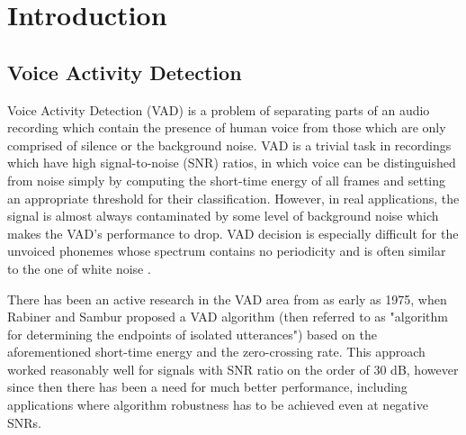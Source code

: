 
\chapter{Introduction} %

\label{Chapter1} %



\section{Voice Activity Detection}

Voice Activity Detection (VAD) is a problem of separating parts of an audio recording which contain the presence of human voice from those which are only comprised of silence or the background noise. VAD is a trivial task in recordings which have high signal-to-noise (SNR) ratios, in which voice can be distinguished from noise simply by computing the short-time energy of all frames and setting an appropriate threshold for their classification. However, in real applications, the signal is almost always contaminated by some level of background noise which makes the VAD's performance to drop. VAD decision is especially difficult for the unvoiced phonemes \cite{Kondoz} whose spectrum contains no periodicity and is often similar to the one of white noise \cite{Michaelis}. \medskip

There has been an active research in the VAD area from as early as 1975, when Rabiner and Sambur \cite{RabinerSambur} proposed a VAD algorithm (then referred to as "algorithm for determining the endpoints of isolated utterances") based on the aforementioned short-time energy and the zero-crossing rate. This approach worked reasonably well for signals with SNR ratio on the order of 30 dB, however since then there has been a need for much better performance, including applications where algorithm robustness has to be achieved even at negative SNRs.


